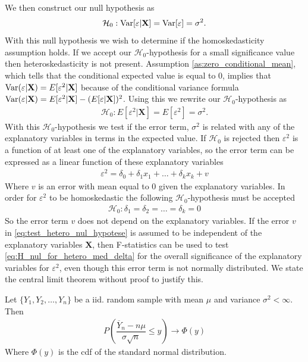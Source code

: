 We then construct our null hypothesis as
\begin{align*}
    \mathcal{H}_0 : \operatorname{\text{Var}}[\varepsilon | \mathbf{X}] = \operatorname{\text{Var}}[\varepsilon] = \sigma^2. 
\end{align*}
With this null hypothesis we wish to determine if the homoskedasticity assumption holds. 
If we accept our $\mathcal{H}_0$-hypothesis for a small significance value then heteroskedasticity is not present.
Assumption \ref{as:zero_conditional_mean}, which tells that the conditional expected value is equal to $0$, implies that $\operatorname{\text{Var}}(\varepsilon | \mathbf{X}) = E[\varepsilon^2 | \mathbf{X}]$ because of the conditional variance formula $\operatorname{\text{Var}}(\varepsilon | \mathbf{X}) = E[\varepsilon^2 | \mathbf{X}] - (E[\varepsilon | \mathbf{X}])^2$. Using this we rewrite our $\mathcal{H}_0$-hypothesis as
\begin{align*}
    \mathcal{H}_0 : E[\varepsilon^2 | \mathbf{X}] = E[\varepsilon^2] = \sigma^2.
\end{align*}
With this $\mathcal{H}_0$-hypothesis we test if the error term, $\sigma^2$ is related with any of the explanatory variables in terms in the expected value.  
If $\mathcal{H}_0$ is rejected then $\varepsilon^2$ is a function of at least one of the explanatory variables, so the error term can be expressed as a linear function of these explanatory variables
\begin{align}\label{eq:test_hetero_nul_hypotese}
    \varepsilon^2 = \delta_0 + \delta_1x_1 + \ldots + \delta_kx_k + v
\end{align}
Where $v$ is an error with mean equal to $0$ given the explanatory variables. In order for $\varepsilon^2$ to be homoskedastic the following $\mathcal{H}_0$-hypothesis must be accepted 
\begin{align}\label{eq:H_nul_for_hetero_med_delta}
    \mathcal{H}_0 : \delta_1 = \delta_2 = \ldots = \delta_k = 0
\end{align}
So the error term $v$ does not depend on the explanatory variables. If the error $v$ in \eqref{eq:test_hetero_nul_hypotese} is assumed to be independent of the explanatory variables $\mathbf{X}$, then F-statistics can be used to test \eqref{eq:H_nul_for_hetero_med_delta} for the overall significance of the explanatory variables for $\varepsilon^2$, even though this error term is not normally distributed. We state the central limit theorem without proof to justify this. 
\begin{theorem}
Let $\{ Y_1, Y_2, \ldots, Y_n \}$ be a iid. random sample with mean $\mu$ and variance $\sigma^2 < \infty$. Then
\begin{align*}
    P\left(\dfrac{\overline{Y}_n - n\mu}{\sigma \sqrt{n}}\leq y\right) \rightarrow \Phi(y)
\end{align*}
Where $\Phi(y)$ is the cdf of the standard normal distribution. 
\end{theorem}
